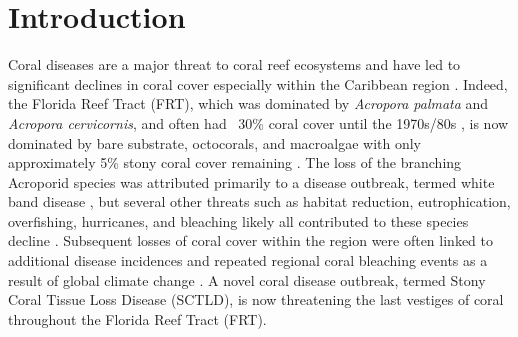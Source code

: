 \section{Introduction}

Coral diseases are a major threat to coral reef ecosystems and have led to significant declines in coral cover especially within the Caribbean region  \citep{richardson1998florida, sutherland2004disease, aronson2001white, harvell2007coral, miller2009coral, brandt2009dynamics}. Indeed, the Florida Reef Tract (FRT), which was dominated by \textit{Acropora palmata} and \textit{Acropora cervicornis}, and often had ~30\% coral cover until the 1970s/80s \citep{dustan1987changes, porter1992quantification}, is now dominated by bare substrate, octocorals, and macroalgae with only approximately 5\% stony coral cover remaining \citep{ruzicka2013temporal}. The loss of the branching Acroporid species was attributed primarily to a disease outbreak, termed white band disease \citep{aronson2001white}, but several other threats such as habitat reduction, eutrophication, overfishing, hurricanes, and bleaching likely all contributed to these species decline \citep{acropora2005atlantic}. Subsequent losses of coral cover within the region were often linked to additional disease incidences and repeated regional coral bleaching events as a result of global climate change \citep{kuta1996abundance, richardson1998florida, sutherland2004disease, gardner2003long, aronson2006conservation, kuffner2015century, manzello2015rapid}. A novel coral disease outbreak, termed Stony Coral Tissue Loss Disease (SCTLD), is now threatening the last vestiges of coral throughout the Florida Reef Tract (FRT).

